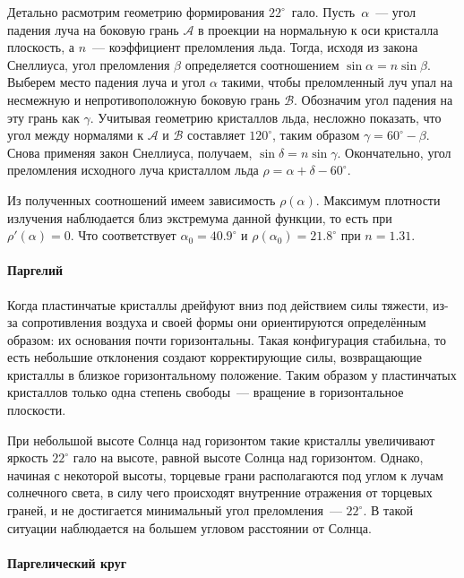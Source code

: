 Детально расмотрим геометрию формирования $22^\circ$~гало. Пусть~$\alpha$~--- угол падения луча на боковую грань $\mathcal{A}$ в проекции на нормальную к оси кристалла плоскость, а $n$~--- коэффициент преломления льда. Тогда, исходя из закона Снеллиуса, угол преломления $\beta$ определяется соотношением $\sin \alpha = n \sin \beta$. Выберем место падения луча и угол $\alpha$ такими, чтобы преломленный луч упал на несмежную и непротивоположную боковую грань $\mathcal{B}$. Обозначим угол падения на эту грань как $\gamma$. Учитывая геометрию кристаллов льда, несложно показать, что угол между нормалями к $\mathcal{A}$ и $\mathcal{B}$ составляет $120^\circ$, таким образом $\gamma = 60^\circ - \beta$. Снова применяя закон Снеллиуса, получаем, $\sin \delta = n \sin \gamma$. Окончательно, угол преломления исходного луча кристаллом льда $\rho =  \alpha + \delta - 60^\circ$.

Из полученных соотношений имеем зависимость $\rho(\alpha)$. Максимум плотности излучения наблюдается близ экстремума данной функции, то есть при $\rho'(\alpha) = 0$. Что соответствует $\alpha_0 = 40.9^\circ$ и $\rho(\alpha_0) = 21.8^\circ$ при $n=1.31$. 

\paragraph{Паргелий}

Когда пластинчатые кристаллы дрейфуют вниз под действием силы тяжести, из-за сопротивления воздуха и своей формы они ориентируются определённым образом: их основания почти горизонтальны. Такая конфигурация стабильна, то есть небольшие отклонения создают корректирующие силы, возвращающие кристаллы в близкое горизонтальному положение. Таким образом у пластинчатых кристаллов только одна степень свободы~--- вращение в горизонтальное плоскости.

При небольшой высоте Солнца над горизонтом такие кристаллы увеличивают яркость $22^\circ$ гало на высоте, равной высоте Солнца над горизонтом. Однако, начиная с некоторой высоты, торцевые грани располагаются под углом к лучам солнечного света, в силу чего происходят внутренние отражения от торцевых граней, и не достигается минимальный угол преломления~--- $22^\circ$. В такой ситуации  наблюдается на большем угловом расстоянии от Солнца.

\paragraph{Паргелический круг}

